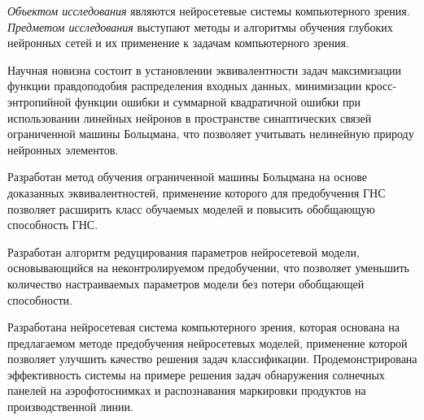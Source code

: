 \textit{Объектом исследования} являются нейросетевые системы компьютерного зрения. \textit{Предметом исследования} выступают методы и алгоритмы обучения глубоких нейронных сетей и их применение к задачам компьютерного зрения.

\vspace{3mm}
\novelty
\vspace{3mm}

Научная новизна состоит в установлении эквивалентности задач максимизации функции правдоподобия распределения входных данных, минимизации кросс-энтропийной функции ошибки и суммарной квадратичной ошибки при использовании линейных нейронов в пространстве синаптических связей ограниченной машины Больцмана, что позволяет учитывать нелинейную природу нейронных элементов.

Разработан метод обучения ограниченной машины Больцмана на основе доказанных эквивалентностей, применение которого для предобучения ГНС позволяет расширить класс обучаемых моделей и повысить обобщающую способность ГНС.

Разработан алгоритм редуцирования параметров нейросетевой модели, основывающийся на неконтролируемом предобучении, что позволяет уменьшить количество настраиваемых параметров модели без потери обобщающей способности.

Разработана нейросетевая система компьютерного зрения, которая основана на предлагаемом методе предобучения нейросетевых моделей, применение которой позволяет улучшить качество решения задач классификации. Продемонстрирована эффективность системы на примере решения задач обнаружения солнечных панелей на аэрофотоснимках и распознавания маркировки продуктов на производственной линии.

\vspace{10mm}
\vspace{3mm}

